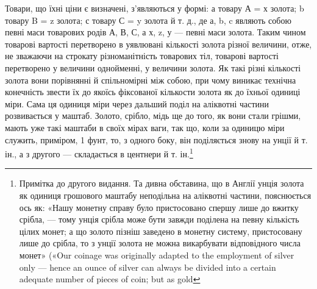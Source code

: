 Товари, що їхні ціни є визначені, з’являються у формі: а товару А = х золота; b товару B = z золота;
с товару С = y золота й т. д., де а, b, c являють собою певні маси товарових родів А, В, С, а х, z,
у — певні маси золота. Таким чином товарові вартості перетворено в уявлювані кількості золота різної
величини, отже, не зважаючи на строкату різноманітність товарових тіл, товарові вартості перетворено
у величини однойменні, у величини золота. Як такі різні кількості золота вони порівнянні й
спільномірні між собою, при чому виникає технічна конечність звести їх до якоїсь фіксованої
кількости золота як до їхньої одиниці міри. Сама ця одиниця міри через дальший поділ на
аліквотні частини розвивається у маштаб. Золото, срібло, мідь ще до того, як вони стали грішми,
мають уже такі маштаби в своїх мірах ваги, так що, коли за одиницю міри служить, приміром, 1 фунт,
то, з одного боку, він поділяється знову на унції й т. ін., а з другого — складається в центнери й
т. ін.\footnote{
Примітка до другого видання. Та дивна обставина, що в Англії унція золота як одиниця грошового
маштабу неподільна на аліквотні частини, пояснюється ось як: «Нашу монетну справу було пристосовано
спершу лише до вжитку срібла, — тому унція срібла може бути завжди поділена на певну кількість цілих
монет; а що золото пізніш заведено в монетну систему, пристосовану лише до срібла, то з унції золота
не можна
викарбувати відповідного числа монет» («Our coinage was originally adapted to the employment of
silver only — hence an ounce of silver can always be divided into a certain adequate number of
pieces of coin; but as gold
}

